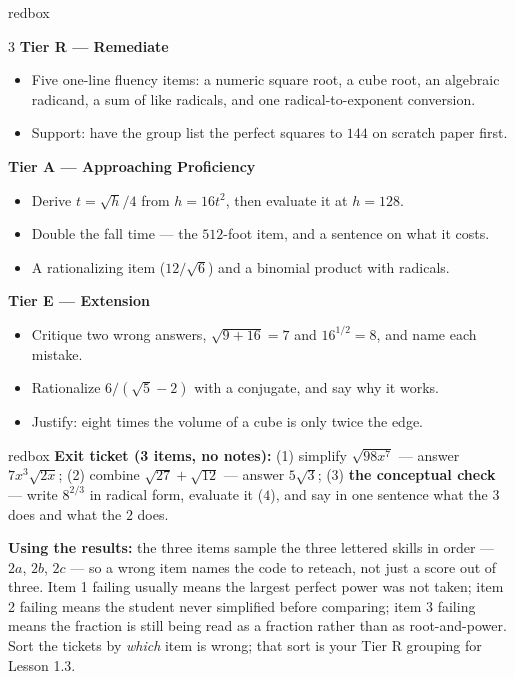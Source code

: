 \documentclass[10pt]{article}
\begin{document}
\boxguard
\begin{skillbox}{redbox}
\begin{multicols}{3}
\textbf{Tier R --- Remediate}
\begin{itemize}[leftmargin=1em, itemsep=1pt, topsep=2pt]
  \item Five one-line fluency items: a numeric square root, a cube root, an algebraic radicand, a
        sum of like radicals, and one radical-to-exponent conversion.
  \item Support: have the group list the perfect squares to $144$ on scratch paper first.
\end{itemize}

\columnbreak
\textbf{Tier A --- Approaching Proficiency}
\begin{itemize}[leftmargin=1em, itemsep=1pt, topsep=2pt]
  \item Derive $t=\sqrt h/4$ from $h=16t^2$, then evaluate it at $h=128$.
  \item Double the fall time --- the $512$-foot item, and a sentence on what it costs.
  \item A rationalizing item ($12/\sqrt6$) and a binomial product with radicals.
\end{itemize}

\columnbreak
\textbf{Tier E --- Extension}
\begin{itemize}[leftmargin=1em, itemsep=1pt, topsep=2pt]
  \item Critique two wrong answers, $\sqrt{9+16}=7$ and $16^{1/2}=8$, and name each mistake.
  \item Rationalize $6/\left(\sqrt5-2\right)$ with a conjugate, and say why it works.
  \item Justify: eight times the volume of a cube is only twice the edge.
\end{itemize}
\end{multicols}
\end{skillbox}

\begin{skillbox}{redbox}
\textbf{Exit ticket (3 items, no notes):} (1) simplify $\sqrt{98x^7}$ --- answer $7x^3\sqrt{2x}$;
(2) combine $\sqrt{27}+\sqrt{12}$ --- answer $5\sqrt3$; (3) \textbf{the conceptual check} --- write
$8^{2/3}$ in radical form, evaluate it ($4$), and say in one sentence what the $3$ does and what
the $2$ does.

\textbf{Using the results:} the three items sample the three lettered skills in order --- $2a$,
$2b$, $2c$ --- so a wrong item names the code to reteach, not just a score out of three. Item 1
failing usually means the largest perfect power was not taken; item 2 failing means the student
never simplified before comparing; item 3 failing means the fraction is still being read as a
fraction rather than as root-and-power. Sort the tickets by \emph{which} item is wrong; that sort
is your Tier R grouping for Lesson 1.3.
\end{skillbox}
\end{document}
